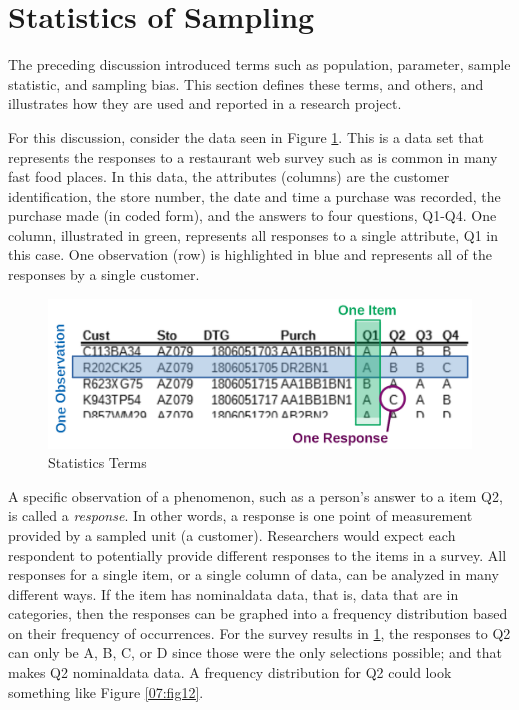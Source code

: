\section{Statistics of Sampling}

The preceding discussion introduced terms such as population, parameter, sample statistic, and sampling bias. This section defines these terms, and others, and illustrates how they are used and reported in a research project.

For this discussion, consider the data seen in Figure \ref{07:fig10}. This is a data set that represents the responses to a restaurant web survey such as is common in many fast food places. In this data, the attributes (columns) are the customer identification, the store number, the date and time a purchase was recorded, the purchase made (in coded form), and the answers to four questions, Q1-Q4. One column, illustrated in green, represents all responses to a single attribute, Q1 in this case. One observation (row) is highlighted in blue and represents all of the responses by a single customer.

\begin{figure}[H]
	\centering
	\includegraphics[]{gfx/07-10}
	\caption{Statistics Terms}
	\label{07:fig10}
\end{figure}

A specific observation of a phenomenon, such as a person's answer to a item Q2, is called a \textit{response}. In other words, a response is one point of measurement provided by a sampled unit (a customer). Researchers would expect each respondent to potentially provide different responses to the items in a survey. All responses for a single item, or a single column of data, can be analyzed in many different ways. If the item has \gls{nominaldata} data, that is, data that are in categories, then the responses can be graphed into a frequency distribution based on their frequency of occurrences. For the survey results in \ref{07:fig10}, the responses to Q2 can only be A, B, C, or D since those were the only selections possible; and that makes Q2 \gls{nominaldata} data. A frequency distribution for Q2 could look something like Figure \ref{07:fig12}.

